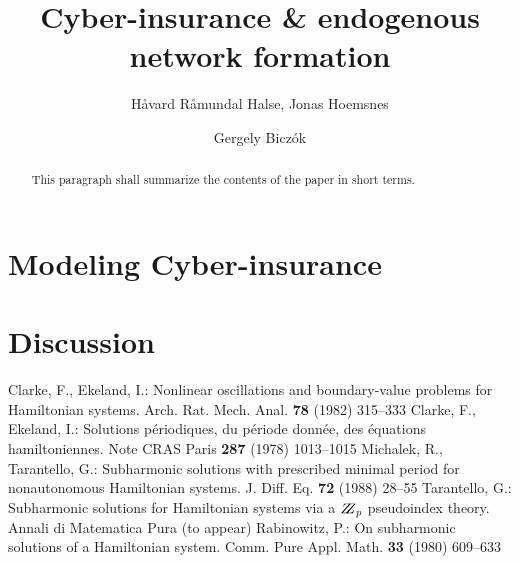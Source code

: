 \documentclass{llncs}
\begin{document}
\title{Cyber-insurance \& endogenous network formation}

\author{Håvard Råmundal Halse, Jonas Hoemsnes \and Gergely Biczók}


\maketitle
%

\begin{abstract}
This paragraph shall summarize the contents of the paper
in short terms.
\end{abstract}
%


\section{Modeling Cyber-insurance}


\section{Discussion}


%
\begin{thebibliography}{[MT1]}
%
Clarke, F., Ekeland, I.:
Nonlinear oscillations and
boundary-value problems for Hamiltonian systems.
Arch. Rat. Mech. Anal. {\bfseries 78} (1982) 315--333
%
Clarke, F., Ekeland, I.:
Solutions p\'{e}riodiques, du
p\'{e}riode donn\'{e}e, des \'{e}quations hamiltoniennes.
Note CRAS Paris {\bfseries 287} (1978) 1013--1015
%
Michalek, R., Tarantello, G.:
Subharmonic solutions with prescribed minimal
period for nonautonomous Hamiltonian systems.
J. Diff. Eq. {\bfseries 72} (1988) 28--55
%
Tarantello, G.:
Subharmonic solutions for Hamiltonian
systems via a $\bbbz_{p}$ pseudoindex theory.
Annali di Matematica Pura (to appear)
%
Rabinowitz, P.:
On subharmonic solutions of a Hamiltonian system.
Comm. Pure Appl. Math. {\bfseries 33} (1980) 609--633
\end{thebibliography}
%
\end{document}
